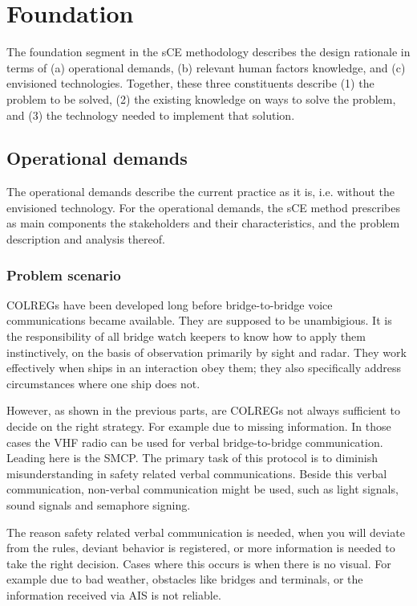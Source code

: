 \chapter{Foundation}
The foundation segment in the \ac{sCE} methodology describes the design rationale in terms of (a) operational demands, (b) relevant human factors knowledge, and (c) envisioned technologies. Together, these three constituents describe (1) the problem to be solved, (2) the existing knowledge on ways to solve the problem, and (3) the technology needed to implement that solution.

\section{Operational demands}
The operational demands describe the current practice as it is, i.e. without the envisioned technology. For the operational demands, the sCE method prescribes as main components the stakeholders and their characteristics, and the problem description and analysis thereof.

\subsection{Problem scenario}
\acf{COLREGs} have been developed long before bridge-to-bridge voice communications became available. They are supposed to be unambigious. It is the responsibility of all bridge watch keepers to know how to apply them instinctively, on the basis of observation primarily by sight and radar. They work effectively when ships in an interaction obey them; they also specifically address circumstances where one ship does not.

However, as shown in the previous parts, are \ac{COLREGs} not always sufficient to decide on the right strategy. For example due to missing information. In those cases the \ac{VHF} radio can be used for verbal bridge-to-bridge communication. Leading here is the \acf{SMCP}. The primary task of this protocol is to diminish misunderstanding in safety related verbal communications. 
Beside this verbal communication, non-verbal communication might be used, such as light signals, sound signals and semaphore signing.

The reason safety related verbal communication is needed, when you will deviate from the rules, deviant behavior is registered, or more information is needed to take the right decision. Cases where this occurs is when there is no visual. For example due to bad weather, obstacles like bridges and terminals, or the information received via \ac{AIS} is not reliable.

